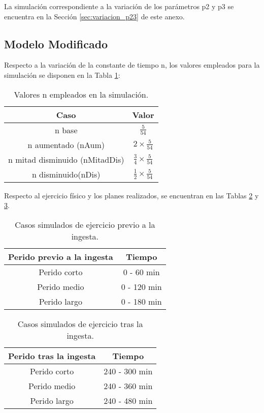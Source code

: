 La simulación correspondiente a la variación de los parámetros p2 y p3 se encuentra en la Sección \ref{sec:variacion_p23} de este anexo.

\subsection{Modelo Modificado}

Respecto a la variación de la constante de tiempo n, los valores empleados para la simulación se disponen en la Tabla \ref{tab:pn}:

\begin{table}[htbp]
    \centering
    \caption{Valores n empleados en la simulación.}
    \begin{tabular}{|c|c|}
        \hline
        Caso & Valor \\
        \hline
        n base & $\frac{5}{54} $\\
        n aumentado (nAum) & $2 \times \frac{5}{54} $\\
        n mitad disminuido (nMitadDis) & $\frac{3}{4} \times \frac{5}{54}$ \\
        n disminuido(nDis) & $\frac{1}{2} \times \frac{5}{54} $\\
        \hline
    \end{tabular}
    \label{tab:pn}
\end{table}

Respecto al ejercicio físico y los planes realizados, se encuentran en las Tablas \ref{tab:ej_previo} y \ref{tab:ej_tras}.

\begin{table}[htbp]
    \centering
    \caption{Casos simulados de ejercicio previo a la ingesta.}
    \begin{tabular}{|c|c|}
        \hline
        Perido previo a la ingesta & Tiempo\\ 
        \hline
        Perido corto & 0 - 60 min \\
        Perido medio & 0 - 120 min \\
        Perido largo & 0 - 180 min \\
        \hline
    \end{tabular}
    \label{tab:ej_previo}
\end{table}

\begin{table}[htbp]
    \centering
    \caption{Casos simulados de ejercicio tras la ingesta.}
    \begin{tabular}{|c|c|}
        \hline
        Perido tras la ingesta & Tiempo\\
        \hline
        Perido corto & 240 - 300 min \\
        Perido medio & 240 - 360 min \\
        Perido largo & 240 - 480 min \\
        \hline
    \end{tabular}
    \label{tab:ej_tras}
\end{table}


